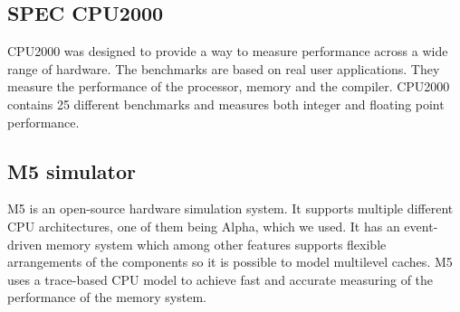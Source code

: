 \subsection{SPEC CPU2000}
CPU2000 was designed to provide a way to measure performance across
a wide range of hardware. The benchmarks are based on real user
applications. They measure the performance of the processor, memory
and the compiler. CPU2000 contains 25 different benchmarks and
measures both integer and floating point performance.
\cite {bib:cpu2000}

\subsection{M5 simulator}
M5 is an open-source hardware simulation system. It supports multiple
different CPU architectures, one of them being Alpha, which we used.
It has an event-driven memory system which among other features supports
flexible arrangements of the components so it is possible to model
multilevel caches. M5 uses a trace-based CPU model to achieve fast and
accurate measuring of the performance of the memory system.
\cite{bib:m5}


